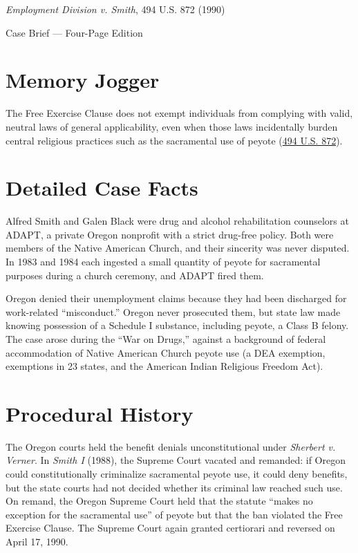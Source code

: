 \documentclass[12pt]{article}
\begin{document}
\begin{center}
{\LARGE \textit{Employment Division v. Smith}, 494 U.S. 872 (1990)\par}
\vspace{0.8em}
{\large Case Brief --- Four-Page Edition\par}
\end{center}
\vspace{1em}

\section{Memory Jogger}

The Free Exercise Clause does not exempt individuals from complying with valid, neutral laws of general applicability, even when those laws incidentally burden central religious practices such as the sacramental use of peyote (\href{https://supreme.justia.com/cases/federal/us/494/872/}{494 U.S. 872}).

\section{Detailed Case Facts}

Alfred Smith and Galen Black were drug and alcohol rehabilitation counselors at ADAPT, a private Oregon nonprofit with a strict drug-free policy. Both were members of the Native American Church, and their sincerity was never disputed. In 1983 and 1984 each ingested a small quantity of peyote for sacramental purposes during a church ceremony, and ADAPT fired them.

Oregon denied their unemployment claims because they had been discharged for work-related ``misconduct.'' Oregon never prosecuted them, but state law made knowing possession of a Schedule I substance, including peyote, a Class B felony. The case arose during the ``War on Drugs,'' against a background of federal accommodation of Native American Church peyote use (a DEA exemption, exemptions in 23 states, and the American Indian Religious Freedom Act).

\section{Procedural History}

The Oregon courts held the benefit denials unconstitutional under \textit{Sherbert v. Verner}. In \textit{Smith I} (1988), the Supreme Court vacated and remanded: if Oregon could constitutionally criminalize sacramental peyote use, it could deny benefits, but the state courts had not decided whether its criminal law reached such use. On remand, the Oregon Supreme Court held that the statute ``makes no exception for the sacramental use'' of peyote but that the ban violated the Free Exercise Clause. The Supreme Court again granted certiorari and reversed on April 17, 1990.
\end{document}
